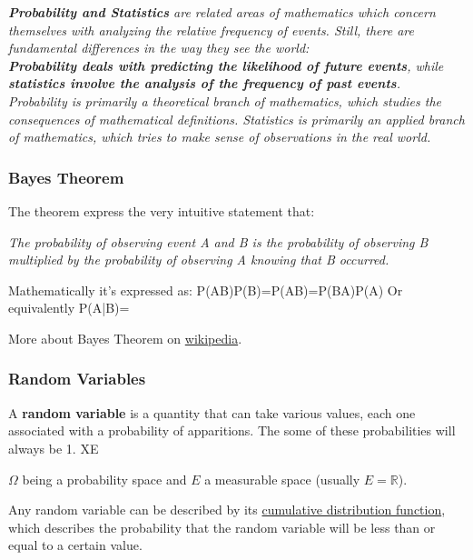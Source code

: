 \begin{framed}
{\it {\bf Probability and Statistics} are related areas of mathematics which concern themselves with analyzing the relative frequency of events. Still, there are fundamental differences in the way they see the world:\\
\textbf{Probability deals with predicting the likelihood of future events}, while \textbf{statistics involve the analysis of the frequency of past events}. \\  
Probability is primarily a theoretical branch of mathematics, which studies the consequences of mathematical definitions. Statistics is primarily an applied branch of mathematics, which tries to make sense of observations in the real world.}
\end{framed}

\subsubsection{Bayes Theorem}
The theorem express the very intuitive statement that:

{\it The probability of observing event A and B is the probability of observing B multiplied by the probability of observing A knowing that B occurred.}

Mathematically it's expressed as: 
\be
P(A\vert B)P(B)=P(A\cap B)=P(B\vert A)P(A)
\ee
Or equivalently
\be
P(A|B)={}
\ee

More about Bayes Theorem on \href{https://en.wikipedia.org/wiki/Bayes_theorem}{wikipedia}.

\subsubsection{Random Variables}
A \textbf{random variable} is a quantity that can take various values, each one associated with a probability of apparitions. The some of these probabilities will always be 1.
\be
X\colon \Omega \to E
\ee

$\Omega$ being a probability space and $E$ a measurable space (usually $E = \mathbb{R}$).

Any random variable can be described by its \href{https://en.wikipedia.org/wiki/Cumulative_distribution_function}{cumulative distribution function}, which describes the probability that the random variable will be less than or equal to a certain value.

